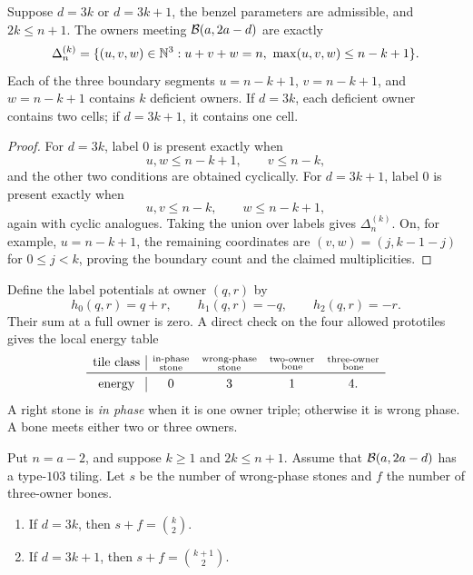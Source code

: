 \begin{lemma}\label{d4:lem:owner-domain}
Suppose $d=3k$ or $d=3k+1$, the benzel parameters are admissible, and
$2k\le n+1$.  The
owners meeting $\mathcal B(a,2a-d)$ are exactly
\[
 \Delta_n^{(k)}=\{(u,v,w)\in\mathbb N^3:u+v+w=n,\
     \max(u,v,w)\le n-k+1\}.
\]
Each of the three boundary segments $u=n-k+1$, $v=n-k+1$, and
$w=n-k+1$ contains $k$ deficient owners.  If $d=3k$, each deficient owner
contains two cells; if $d=3k+1$, it contains one cell.
\end{lemma}

\begin{proof}
For $d=3k$, label $0$ is present exactly when
\[
 u,w\le n-k+1,\qquad v\le n-k,
\]
and the other two conditions are obtained cyclically.  For $d=3k+1$, label
$0$ is present exactly when
\[
 u,v\le n-k,\qquad w\le n-k+1,
\]
again with cyclic analogues.  Taking the union over labels gives
$\Delta_n^{(k)}$.  On, for example, $u=n-k+1$, the remaining coordinates
are $(v,w)=(j,k-1-j)$ for $0\le j<k$, proving the boundary count and the
claimed multiplicities.
\end{proof}

Define the label potentials at owner $(q,r)$ by
\begin{equation}\label{d4:eq:potential}
 h_0(q,r)=q+r,\qquad h_1(q,r)=-q,\qquad h_2(q,r)=-r.
\end{equation}
Their sum at a full owner is zero.  A direct check on the four allowed
prototiles gives the local energy table
\begin{equation}\label{d4:eq:energy-table}
\begin{array}{c|cccc}
\text{tile class}&\substack{\text{in-phase}\\\text{stone}}
 &\substack{\text{wrong-phase}\\\text{stone}}
 &\substack{\text{two-owner}\\\text{bone}}
 &\substack{\text{three-owner}\\\text{bone}}\\ \midrule
\text{energy}&0&3&1&4.
\end{array}
\end{equation}
A right stone is \emph{in phase} when it is one owner triple; otherwise it is
wrong phase.  A bone meets either two or three owners.

\begin{theorem}\label{d4:thm:defects}
Put $n=a-2$, and suppose $k\ge1$ and $2k\le n+1$.  Assume that
$\mathcal B(a,2a-d)$ has a type-$103$ tiling.  Let $s$ be the number of wrong-phase
stones and $f$ the number of three-owner bones.
\begin{enumerate}
\item If $d=3k$, then $s+f=\binom{k}{2}$.
\item If $d=3k+1$, then $s+f=\binom{k+1}{2}$.
\end{enumerate}
\end{theorem}

